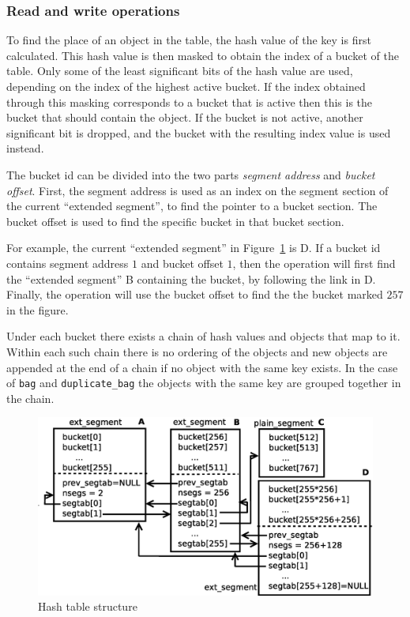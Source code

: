 \documentclass[aps,pre,preprint,nofootinbib]{revtex4}
\begin{document}
\subsubsection{Read and write operations}

To find the place of an object in the table, the hash value of the key is first calculated.
This hash value is then masked to obtain the index of a bucket of the table.
Only some of the least significant bits of the hash value are used, depending on the index of the highest active bucket.
If the index obtained through this masking corresponds to a bucket that is active then this is the bucket that should contain the object.
If the bucket is not active, another significant bit is dropped, and the bucket with the resulting index value is used instead.
 

The bucket id can be divided into the two parts \emph{segment address} and \emph{bucket offset}.
First, the segment address is used as an index on the segment section of the current ``extended segment'', to find the pointer to a bucket section.
The bucket offset is used to find the specific bucket in that bucket section.

For example, the current ``extended segment'' in Figure~\ref{fig:hash_table_structure} is D.
If a bucket id contains segment address $1$ and bucket offset $1$, then the operation will first find the ``extended segment'' B containing the bucket, by following the link in D. Finally, the operation will use the bucket offset to find the the bucket marked $257$ in the figure.

Under each bucket there exists a chain of hash values and objects that map to it.
Within each such chain there is no ordering of the objects and new objects are appended at the end of a chain if no object with the same key exists.
In the case of \verb|bag| and \verb|duplicate_bag| the objects with the same key are grouped together in the chain.

\begin{figure}[htb]
  \centering
  \includegraphics[width=1.0\textwidth]{hash_table_structure.eps}
  \caption{Hash table structure}
  \label{fig:hash_table_structure}
\end{figure}
\end{document}
